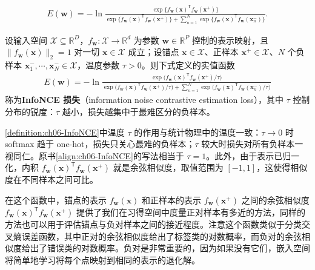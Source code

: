 \documentclass[../../main.tex]{subfiles}
\begin{document}
\begin{align}
E(\boldsymbol{w})=-\ln\frac{\exp\bigl\{f_{\boldsymbol{w}}(\boldsymbol{x})^{\mathsf T}f_{\boldsymbol{w}}(\boldsymbol{x}^{+})\bigr\}}{\exp\bigl\{f_{\boldsymbol{w}}(\boldsymbol{x})^{\mathsf T}f_{\boldsymbol{w}}(\boldsymbol{x}^{+})\bigr\}+\sum_{n=1}^{N}\exp\bigl\{f_{\boldsymbol{w}}(\boldsymbol{x})^{\mathsf T}f_{\boldsymbol{w}}(\boldsymbol{x}_n^{-})\bigr\}}.
\label{align:ch06-InfoNCE}
\end{align}

\begin{definition}[InfoNCE 损失]\label{definition:ch06-InfoNCE}
设输入空间 $\mathcal{X}\subseteq\mathbb{R}^{D}$，$f_{\boldsymbol{w}}:\mathcal{X}\to\mathbb{R}^{d}$ 为参数 $\boldsymbol{w}\in\mathbb{R}^{P}$ 控制的表示映射，且 $\|f_{\boldsymbol{w}}(\boldsymbol{x})\|_{2}=1$ 对一切 $\boldsymbol{x}\in\mathcal{X}$ 成立；设锚点 $\boldsymbol{x}\in\mathcal{X}$、正样本 $\boldsymbol{x}^{+}\in\mathcal{X}$、$N$ 个负样本 $\boldsymbol{x}_{1}^{-},\cdots,\boldsymbol{x}_{N}^{-}\in\mathcal{X}$，温度参数 $\tau>0$。则下式定义的实值函数
\begin{align}
E(\boldsymbol{w})=-\ln\frac{\exp\bigl(f_{\boldsymbol{w}}(\boldsymbol{x})^{\mathsf T}f_{\boldsymbol{w}}(\boldsymbol{x}^{+})/\tau\bigr)}{\exp\bigl(f_{\boldsymbol{w}}(\boldsymbol{x})^{\mathsf T}f_{\boldsymbol{w}}(\boldsymbol{x}^{+})/\tau\bigr)+\sum_{n=1}^{N}\exp\bigl(f_{\boldsymbol{w}}(\boldsymbol{x})^{\mathsf T}f_{\boldsymbol{w}}(\boldsymbol{x}_n^{-})/\tau\bigr)}
\label{align:ch06-InfoNCE温度}
\end{align}
称为\textbf{InfoNCE 损失}（information noise contrastive estimation loss），其中 $\tau$ 控制分布的锐度：$\tau$ 越小，损失越集中于最难区分的负样本。
\end{definition}

\begin{remark}\cref{definition:ch06-InfoNCE}中温度 $\tau$ 的作用与统计物理中的温度一致：$\tau\to0$ 时 softmax 趋于 one-hot，损失只关心最难的负样本；$\tau$ 较大时损失对所有负样本一视同仁。原书\eqref{align:ch06-InfoNCE}的写法相当于 $\tau=1$。此外，由于表示已归一化，内积 $f_{\boldsymbol{w}}(\boldsymbol{x})^{\mathsf T}f_{\boldsymbol{w}}(\boldsymbol{x}^{+})$ 就是余弦相似度，取值范围为 $[-1,1]$，这使得相似度在不同样本之间可比。
\end{remark}

在这个函数中，锚点的表示 $f_{\boldsymbol{w}}(\boldsymbol{x})$ 和正样本的表示 $f_{\boldsymbol{w}}(\boldsymbol{x}^{+})$ 之间的余弦相似度 $f_{\boldsymbol{w}}(\boldsymbol{x})^{\mathsf T}f_{\boldsymbol{w}}(\boldsymbol{x}^{+})$ 提供了我们在习得空间中度量正对样本有多近的方法，同样的方法也可以用于评估锚点与负对样本之间的接近程度。注意这个函数类似于分类交叉熵误差函数，其中正对的余弦相似度给出了标签类的对数概率，而负对的余弦相似度给出了错误类的对数概率。负对是非常重要的，因为如果没有它们，嵌入空间将简单地学习将每个点映射到相同的表示的退化解。
\end{document}
